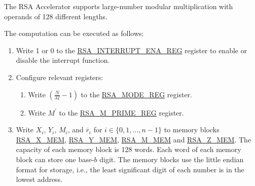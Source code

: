 \documentclass[main\_\_EN.tex]{subfiles}
\begin{document}
The RSA Accelerator supports large-number modular multiplication with operands of 128 different lengths.

The computation can be executed as follows:

\begin{enumerate}

    \item Write 1 or 0 to the \hyperref[regdesc:RSAINTERRUPTENAREG]{RSA\_INTERRUPT\_ENA\_REG} register to enable or disable the interrupt function.

    \item Configure relevant registers:

    \begin{enumerate}
        \item Write \begin{math}( \frac{N}{32} - 1 )\end{math} to the \hyperref[regdesc:RSAMODEXPMODEREG]{RSA\_MODE\_REG} register.

        \item Write \begin{math}M^{\prime}\end{math} to the \hyperref[regdesc:RSAMPRIMEREG]{RSA\_M\_PRIME\_REG} register.

    \end{enumerate}

    \item Write
        \begin{math}X_{i}\end{math},
        \begin{math}Y_{i}\end{math},
        \begin{math}M_{i}\end{math}, and
        \begin{math}\overline{r}_{i}\end{math} for \begin{math}i \in \{ 0, 1, \dots, n-1 \} \end{math} to memory blocks \hyperref[regdesc:RSAmemory]{RSA\_X\_MEM}, \hyperref[regdesc:RSAmemory]{RSA\_Y\_MEM}, \hyperref[regdesc:RSAmemory]{RSA\_M\_MEM} and \hyperref[regdesc:RSAmemory]{RSA\_Z\_MEM}. The capacity of each memory block is 128 words. Each word of each memory block can store one base-\begin{math}b\end{math} digit. The memory blocks use the little endian format for storage, i.e., the least significant digit of each number is in the lowest address.


\end{enumerate}
\end{document}
